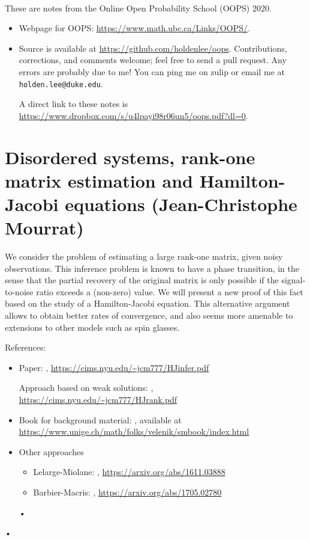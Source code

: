 
~

These are notes from the Online Open Probability School (OOPS) 2020. 
\begin{itemize}
\item
Webpage for OOPS: \url{https://www.math.ubc.ca/Links/OOPS/}.
\item
Source is available at \url{https://github.com/holdenlee/oops}. Contributions, corrections, and comments welcome; feel free to send a pull request. Any errors are probably due to me! You can ping me on zulip or email me at \texttt{holden.lee@duke.edu}.

A direct link to these notes is \url{https://www.dropbox.com/s/u4lpayi98r06un5/oops.pdf?dl=0}.
\end{itemize}

\section{Disordered systems, rank-one matrix estimation and Hamilton-Jacobi equations (Jean-Christophe Mourrat)}

We consider the problem of estimating a large rank-one matrix, given noisy observations. This inference problem is known to have a phase transition, in the sense that the partial recovery of the original matrix is only possible if the signal-to-noise ratio exceeds a (non-zero) value. We will present a new proof of this fact based on the study of a Hamilton-Jacobi equation. This alternative argument allows to obtain better rates of convergence, and also seems more amenable to extensions to other models such as spin glasses. 

References:
\begin{itemize}
\item
Paper: \cite{mourrat2018hamilton}, \url{https://cims.nyu.edu/~jcm777/HJinfer.pdf} %

Approach based on weak solutions: \cite{mourrat2019hamilton}, \url{https://cims.nyu.edu/~jcm777/HJrank.pdf} %


\item
Book for background material: \cite{friedli2017statistical}, available at \url{https://www.unige.ch/math/folks/velenik/smbook/index.html}
\item Other approaches
\begin{itemize}
\item
Lelarge-Miolane: \cite{lelarge2019fundamental}, \url{https://arxiv.org/abs/1611.03888}
\item 
Barbier-Macris: \cite{barbier2019adaptive}, \url{https://arxiv.org/abs/1705.02780}
\end{itemize}•
\end{itemize}• 

